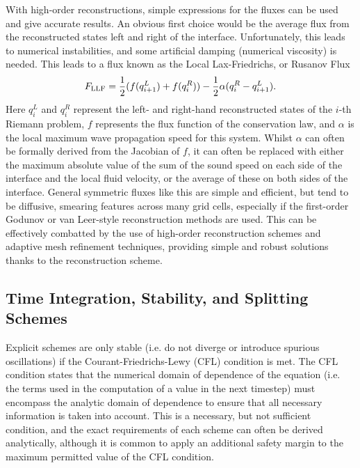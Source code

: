 With high-order reconstructions, simple expressions for the fluxes can be used and give accurate results.
An obvious first choice would be the average flux from the reconstructed states left and right of the interface.
Unfortunately, this leads to numerical instabilities, and some artificial damping (numerical viscosity) is needed.
This leads to a flux known as the Local Lax-Friedrichs, or Rusanov Flux \citep{Rusanov1962}
\begin{equation}
    F_{\textnormal{LLF}} = \frac{1}{2}(f(q_{i+1}^L) + f(q_i^R)) - \frac{1}{2}\alpha(q_i^R - q_{i+1}^L).
\end{equation}
Here $q_i^L$ and $q_i^R$ represent the left- and right-hand reconstructed states of the $i$-th Riemann problem, $f$ represents the flux function of the conservation law, and $\alpha$ is the local maximum wave propagation speed for this system.
Whilst $\alpha$ can often be formally derived from the Jacobian of $f$, it can often be replaced with either the maximum absolute value of the sum of the sound speed on each side of the interface and the local fluid velocity, or the average of these on both sides of the interface.
General symmetric fluxes like this are simple and efficient, but tend to be diffusive, smearing features across many grid cells, especially if the first-order Godunov or van Leer-style reconstruction methods are used.
This can be effectively combatted by the use of high-order reconstruction schemes and adaptive mesh refinement techniques, providing simple and robust solutions thanks to the reconstruction scheme.

\subsection{Time Integration, Stability, and Splitting Schemes}\label{Sec:HydroStability}

Explicit schemes are only stable (i.e. do not diverge or introduce spurious oscillations) if the Courant-Friedrichs-Lewy (CFL) condition is met.
The CFL condition states that the numerical domain of dependence of the equation (i.e. the terms used in the computation of a value in the next timestep) must encompass the analytic domain of dependence to ensure that all necessary information is taken into account.
This is a necessary, but not sufficient condition, and the exact requirements of each scheme can often be derived analytically, although it is common to apply an additional safety margin to the maximum permitted value of the CFL condition.

